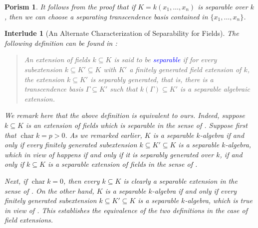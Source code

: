 \documentclass[10pt]{article}
\theoremstyle{thmstyle}
\theoremstyle{defstyle}
\newtheorem{porism}[theorem]{Porism}
\newtheorem{interlude}[theorem]{Interlude}
\newcommand{\chr}{\operatorname{char}}
\newcommand{\define}[1]{\textcolor{blue}{\textit{#1}}}
\begin{document}
\begin{porism}
    It follows from the proof that if $K = k(x_1,\dots,x_n)$ is separable over $k$, then we can choose a separating transcendence basis contained in $\{x_1,\dots,x_n\}$.
\end{porism}

\begin{mdframed}
\begin{interlude}[An Alternate Characterization of Separability for Fields]
    The following definition can be found in \cite[Tag 030I]{stacks-project}: 
    \begin{quotation}
        An extension of fields $k\subseteq K$ is said to be \define{separable} if for every subextension $k\subseteq K'\subseteq K$ with $K'$ a finitely generated field extension of $k$, the extension $k\subseteq K'$ is separably generated, that is, there is a transcendence basis $\Gamma\subseteq K'$ such that $k(\Gamma)\subseteq K'$ is a separable algebraic extension.
    \end{quotation}
    We remark here that the above definition is equivalent to ours. Indeed, suppose $k\subseteq K$ is an extension of fields which is separable in the sense of . Suppose first that $\chr k = p > 0$. As we remarked earlier, $K$ is a separable $k$-algebra if and only if every finitely generated subextension $k\subseteq K'\subseteq K$ is a separable $k$-algebra, which in view of  happens if and only if it is separably generated over $k$, if and only if $k\subseteq K$ is a separable extension of fields in the sense of \cite[Tag 030I]{stacks-project}.

    Next, if $\chr k = 0$, then every $k\subseteq K$ is clearly a separable extension in the sense of \cite[Tag 030I]{stacks-project}. On the other hand, $K$ is a separable $k$-algebra if and only if every finitely generated subextension $k\subseteq K'\subseteq K$ is a separable $k$-algebra, which is true in view of . This establishes the equivalence of the two definitions in the case of field extensions.
\end{interlude}
\end{mdframed}
\end{document}
